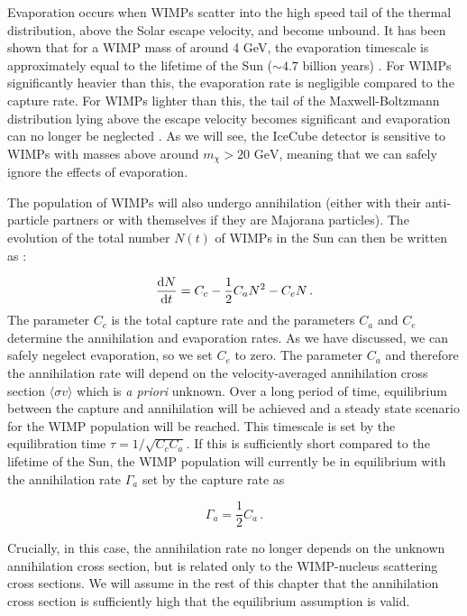 Evaporation occurs when WIMPs scatter into the high speed tail of the thermal distribution, above the Solar escape velocity, and become unbound. It has been shown that for a WIMP mass of around 4 GeV, the evaporation timescale is approximately equal to the lifetime of the Sun ($\sim4.7$ billion years) \cite{Gould:1987b}. For WIMPs significantly heavier than this, the evaporation rate is negligible compared to the capture rate. For WIMPs lighter than this, the tail of the Maxwell-Boltzmann distribution lying above the escape velocity becomes significant and evaporation can no longer be neglected \cite{Busoni:2013b}. As we will see, the IceCube detector is sensitive to WIMPs with masses above around $m_\chi > 20 \textrm{ GeV} $, meaning that we can safely ignore the effects of evaporation.

The population of WIMPs will also undergo annihilation (either with their anti-particle partners or with themselves if they are Majorana particles). The evolution of the total number $N(t)$ of WIMPs in the Sun can then be written as \cite{Griest:1987}:

\begin{equation}
\frac{\mathrm{d}N}{\mathrm{d}t} = C_c - \frac{1}{2}C_a N^2 - C_e N\,.
\end{equation}
The parameter $C_c$ is the total capture rate and the parameters $C_a$ and $C_e$ determine the annihilation and evaporation rates. As we have discussed, we can safely negelect evaporation, so we set $C_e$ to zero. The parameter $C_a$ and therefore the annihilation rate will depend on the velocity-averaged annihilation cross section $\langle \sigma v \rangle$ which is \textit{a priori} unknown. Over a long period of time, equilibrium between the capture and annihilation will be achieved and a steady state scenario for the WIMP population will be reached. This timescale is set by the equilibration time $\tau = 1/\sqrt{C_c C_a}$. If this is sufficiently short compared to the lifetime of the Sun, the WIMP population will currently be in equilibrium with the annihilation rate $\Gamma_a$ set by the capture rate as

\begin{equation}
\Gamma_a = \frac{1}{2}C_a\,.
\end{equation}

Crucially, in this case, the annihilation rate no longer depends on the unknown annihilation cross section, but is related only to the WIMP-nucleus scattering cross sections. We will assume in the rest of this chapter that the annihilation cross section is sufficiently high that the equilibrium assumption is valid.

